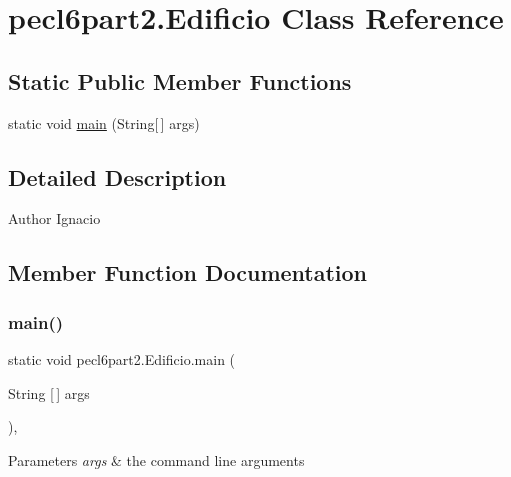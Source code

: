 \hypertarget{classpecl6part2_1_1_edificio}{}\section{pecl6part2.\+Edificio Class Reference}
\label{classpecl6part2_1_1_edificio}
\subsection*{Static Public Member Functions}
\begin{DoxyCompactItemize}
\item 
static void \mbox{\hyperlink{classpecl6part2_1_1_edificio_a85dee95dbbe404dc18e7b2f0f112a026}{main}} (String\mbox{[}$\,$\mbox{]} args)
\end{DoxyCompactItemize}


\subsection{Detailed Description}
\begin{DoxyAuthor}{Author}
Ignacio 
\end{DoxyAuthor}


\subsection{Member Function Documentation}
\mbox{\label{classpecl6part2_1_1_edificio_a85dee95dbbe404dc18e7b2f0f112a026}} 
\subsubsection{\texorpdfstring{main()}{main()}}
{\footnotesize\ttfamily static void pecl6part2.\+Edificio.\+main (\begin{DoxyParamCaption}\item[{String \mbox{[}$\,$\mbox{]}}]{args }\end{DoxyParamCaption})\hspace{0.3cm}{\ttfamily [inline]}, {\ttfamily [static]}}


\begin{DoxyParams}{Parameters}
{\em args} & the command line arguments \\
\hline
\end{DoxyParams}


